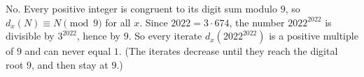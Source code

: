 No. Every positive integer is congruent to its digit sum modulo $9$, so $d_x(N)\equiv N\pmod9$ for all $x$. Since $2022=3\cdot674$, the number $2022^{2022}$ is divisible by $3^{2022}$, hence by $9$. So every iterate $d_x\!\left(2022^{2022}\right)$ is a positive multiple of $9$ and can never equal $1$. (The iterates decrease until they reach the digital root $9$, and then stay at $9$.)
